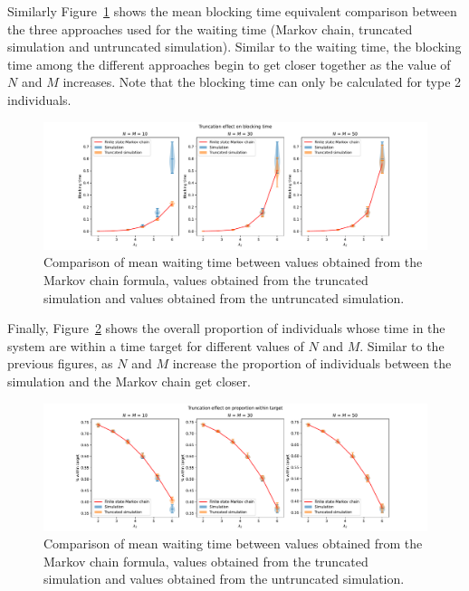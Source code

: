 Similarly Figure~\ref{fig:markov_vs_des_blocking_time_comparison_overall} shows
the mean blocking time equivalent comparison between the three approaches used
for the waiting time (Markov chain, truncated simulation and untruncated
simulation).
Similar to the waiting time, the blocking time among the different approaches
begin to get closer together as the value of \(N\) and \(M\) increases.
Note that the blocking time can only be calculated for type 2 individuals.

\begin{figure}[H]
    \includegraphics[width=\textwidth]{chapters/03_queueing_model/img/numeric_results_and_timings/truncation_effect/blocking/demo.pdf}
    \caption{
        Comparison of mean waiting time between values obtained from the Markov 
        chain formula, values obtained from the truncated simulation and values
        obtained from the untruncated simulation.
    }
    \label{fig:markov_vs_des_blocking_time_comparison_overall}
\end{figure}

Finally, Figure~\ref{fig:markov_vs_des_proportion_within_time_comparison_overall}
shows the overall proportion of individuals whose time in the system are within
a time target for different values of \(N\) and \(M\).
Similar to the previous figures, as \(N\) and \(M\) increase the proportion of
individuals between the simulation and the Markov chain get closer.


\begin{figure}[H]
    \includegraphics[width=\textwidth]{chapters/03_queueing_model/img/numeric_results_and_timings/truncation_effect/proportion/demo.pdf}
    \caption{
        Comparison of mean waiting time between values obtained from the Markov 
        chain formula, values obtained from the truncated simulation and values
        obtained from the untruncated simulation.
    }
    \label{fig:markov_vs_des_proportion_within_time_comparison_overall}
\end{figure}

